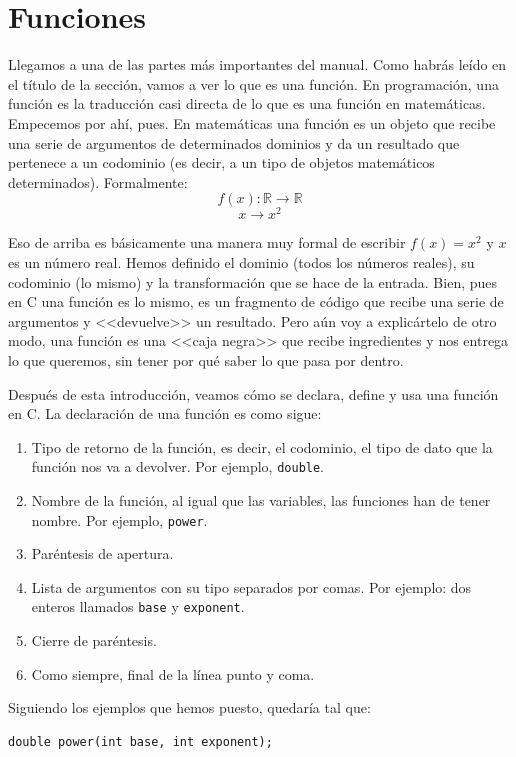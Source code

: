 \documentclass[a4paper]{article}
\begin{document}
\section{Funciones}
\label{funciones}
Llegamos a una de las partes más importantes del manual. Como habrás leído en el
título de la sección, vamos a ver lo que es una función. En programación, una
función es la traducción casi directa de lo que es una función en matemáticas.
Empecemos por ahí, pues. En matemáticas una función es un objeto que recibe una
serie de argumentos de determinados dominios y da un resultado que pertenece
a un codominio (es decir, a un tipo de objetos matemáticos determinados).
Formalmente:
$$
f(x) : \mathbb{R} \longrightarrow \mathbb{R}
$$
$$
x \to x^2
$$

Eso de arriba es básicamente una manera muy formal de escribir $f(x) = x^2$ y
$x$ es un número real. Hemos definido el dominio (todos los números reales),
su codominio (lo mismo) y la transformación que se hace de la entrada. Bien, pues
en C una función es lo mismo, es un fragmento de código que recibe una serie
de argumentos y <<devuelve>> un resultado. Pero aún voy a explicártelo de otro
modo, una función es una <<caja negra>> que recibe ingredientes y nos entrega
lo que queremos, sin tener por qué saber lo que pasa por dentro.

Después de esta introducción, veamos cómo se declara, define y usa una función
en C. La declaración de una función es como sigue:
\begin{enumerate}
\item Tipo de retorno de la función, es decir, el codominio, el tipo de dato
que la función nos va a devolver. Por ejemplo, \lstinline[style=C]{double}.
\item Nombre de la función, al igual que las variables, las funciones han de
tener nombre. Por ejemplo, \verb!power!.
\item Paréntesis de apertura.
\item Lista de argumentos con su tipo separados por comas. Por ejemplo: dos
enteros llamados \verb!base! y \verb!exponent!.
\item Cierre de paréntesis.
\item Como siempre, final de la línea punto y coma.
\end{enumerate}

Siguiendo los ejemplos que hemos puesto, quedaría tal que:


\noindent
\begin{minipage}[H]{\linewidth}
\mbox{}
\begin{lstlisting}[style=C, label={lst:functionDeclaration},
caption={Declaración de una función en C}]
double power(int base, int exponent);
\end{lstlisting}
\end{minipage}
\end{document}
